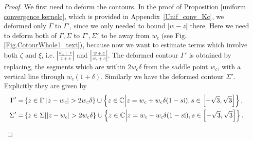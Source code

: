 \documentclass[cmp]{svjour}
\numberwithin{theorem}{section}
\numberwithin{equation}{section}
\def\ii{{\rm i}}
\begin{document}
\begin{proof}
We first need to deform the contours. In the proof of Proposition \ref{uniform convergence kernelc}, 
which is provided in Appendix~\ref{Unif_conv_Kc}, we deformed only $\Gamma$ to $\Gamma'$, since we only 
needed to bound $|w-z|$ there. Here we need to deform both of $\Gamma, \Sigma$ to $\Gamma', \Sigma'$ to be away from $w_c$ (see Fig. \ref{Fig.CotourWhole1_text}), because now we want to estimate terms which involve both $\zeta$ and $\xi$, i.e. $\left| \frac{w_c+c}{z+c}\right|$ and $\left| \frac{w+c}{w_c+c}\right|$.
The deformed contour $\Gamma'$ is obtained by replacing, the segments which are within $2 w_c \delta$ from the saddle point $w_c$, with a vertical line through $w_c ( 1+ \delta)$. Similarly we have the deformed contour $\Sigma'$. Explicitly they are given by 
\begin{subequations}
\begin{align}
	\Gamma' =& \left\{ z \in \Gamma \middle| | z - w_c | > 2 w_c \delta  \right\} \cup \left\{ z \in \mathbb{C} \middle| z = w_c + w_c \delta (1 - s \ii) , s \in \left[  -\sqrt{3} , \sqrt{3} \right]  \right\} , \label{Gamma_prime}  
	\\
	\Sigma' =& \left\{ z \in \Sigma \middle| | z - w_c | > 2 w_c \delta  \right\} \cup \left\{ z \in \mathbb{C} \middle| z = w_c - w_c \delta (1 - s \ii) , s \in \left[  -\sqrt{3} , \sqrt{3} \right]  \right\} . \label{Sigma_prime} 
\end{align}
\end{subequations}


\begin{figure}[h]
\begin{center}
\end{center}
\end{figure}
\end{proof}
\end{document}
